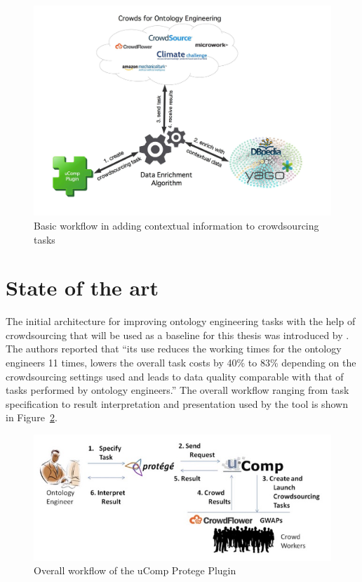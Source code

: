 \documentclass[12pt, notitlepage]{article}
\begin{document}
\begin{figure}[H]
	 \includegraphics[width=\textwidth]{graphics/new_architecture}
	 \caption{Basic workflow in adding contextual information to crowdsourcing tasks}\label{fig:new_architecture}
\end{figure}

\section{State of the art}

The initial architecture for improving ontology engineering tasks with the help of crowdsourcing that will be used as a baseline for this thesis was introduced by \citet{wohlgenannt2016crowd}. The authors reported that \enquote{its use reduces the working times for the ontology engineers 11 times, lowers the overall task costs by 40\% to 83\% depending on the crowdsourcing settings used and leads to data quality comparable with that of tasks performed by ontology engineers.} The overall workflow ranging from task specification to result interpretation and presentation used by the tool is shown in Figure~\ref{fig:ucomp_workflow}.
\begin{figure}[H]
	 \includegraphics[width=\textwidth]{graphics/ucomp_workflow}
	 \caption{Overall workflow of the uComp Protege Plugin~\cite{wohlgenannt2016crowd}}\label{fig:ucomp_workflow}
\end{figure}
\end{document}
